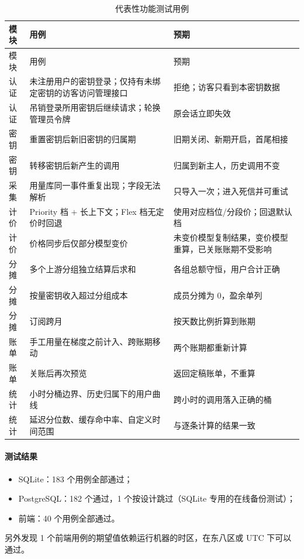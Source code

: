 \begin{longtable}{@{}p{}p{}p{}@{}}
\caption{代表性功能测试用例}\label{tab:functest}\\
\toprule 模块 & 用例 & 预期 \\ \midrule\endfirsthead
\toprule 模块 & 用例 & 预期 \\ \midrule\endhead
认证 & 未注册用户的密钥登录；仅持有未绑定密钥的访客访问管理接口 & 拒绝；访客只看到本密钥数据 \\
认证 & 吊销登录所用密钥后继续请求；轮换管理员令牌 & 原会话立即失效 \\
密钥 & 重置密钥后新旧密钥的归属期 & 旧期关闭、新期开启，首尾相接 \\
密钥 & 转移密钥后新产生的调用 & 归属到新主人，历史调用不变 \\
采集 & 用量库同一事件重复出现；字段无法解析 & 只导入一次；进入死信并可重试 \\
计价 & Priority 档 + 长上下文；Flex 档无定价时回退 & 使用对应档位/分段价；回退默认档 \\
计价 & 价格同步后仅部分模型变价 & 未变价模型复制结果，变价模型重算，已关账账期不受影响 \\
分摊 & 多个上游分组独立结算后求和 & 各组总额守恒，用户合计正确 \\
分摊 & 按量密钥收入超过分组成本 & 成员分摊为 0，盈余单列 \\
分摊 & 订阅跨月 & 按天数比例折算到账期 \\
账单 & 手工用量在梯度之前计入、跨账期移动 & 两个账期都重新计算 \\
账单 & 关账后再次预览 & 返回定稿账单，不重算 \\
统计 & 小时分桶边界、历史归属下的用户曲线 & 跨小时的调用落入正确的桶 \\
统计 & 延迟分位数、缓存命中率、自定义时间范围 & 与逐条计算的结果一致 \\
\bottomrule
\end{longtable}

\paragraph{测试结果}
\begin{itemize}
  \item SQLite：183 个用例全部通过；
  \item PostgreSQL：182 个通过，1 个按设计跳过（SQLite 专用的在线备份测试）；
  \item 前端：40 个用例全部通过。
\end{itemize}
另外发现 1 个前端用例的期望值依赖运行机器的时区，在东八区或 UTC 下可以通过。

